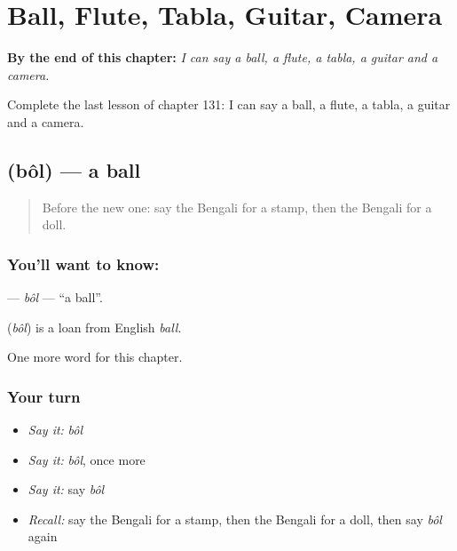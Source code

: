 
\chapter{Ball, Flute, Tabla, Guitar, Camera}
\label{ch:bn-ball-flute-tabla-guitar-camera}

\begin{chapteropening}
\textbf{By the end of this chapter:} \emph{I can say a ball, a flute, a tabla, a guitar and a camera.}

Complete the last lesson of chapter 131: I can say a ball, a flute, a tabla, a guitar and a camera.
\end{chapteropening}

\section[\texorpdfstring{\bn{বল} (bôl)}{বল (bôl)}]{ (bôl) — a ball}

\label{lesson:BN-C131-bol}



\begin{quote}
Before the new one: say the Bengali for a stamp, then the Bengali for a doll.
\end{quote}

\subsection*{You'll want to know: }
\textbf{} — \emph{bôl} — \textquotedblleft{}a ball\textquotedblright{}.

\begin{cousinweb}
\textbf{} (\emph{bôl}) is a loan from English \emph{ball}.
\end{cousinweb}

\begin{grammarlens}[title={What you've built}]
One more word for this chapter.
\end{grammarlens}

\subsection*{Your turn}
\begin{itemize}
\raggedright
  \item \emph{Say it:} \emph{bôl}
  \item \emph{Say it:} \emph{bôl}, once more
  \item \emph{Say it:} say \emph{bôl}
  \item \emph{Recall:} say the Bengali for a stamp, then the Bengali for a doll, then say \emph{bôl} again
\end{itemize}

